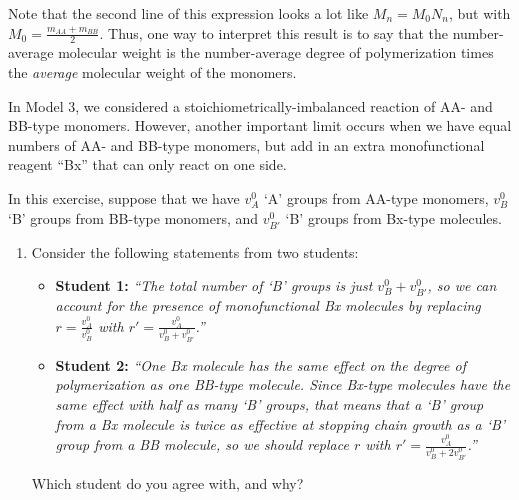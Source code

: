 \begin{activity}
\begin{exercises}
\begin{enumerate}
\begin{solution}
{						Note that the second line of this expression looks a lot like $M_n = M_0 N_n$, but with $M_0 = \frac{m_{AA} + m_{BB}}{2}$.  Thus, one way to interpret this result is to say that the number-average molecular weight is the number-average degree of polymerization times the \emph{average} molecular weight of the monomers.
					}\end{solution}
				
			\end{enumerate}
		
		\exercise In Model 3, we considered a stoichiometrically-imbalanced reaction of AA- and BB-type monomers.  However, another important limit occurs when we have equal numbers of AA- and BB-type monomers, but add in an extra monofunctional reagent ``Bx'' that can only react on one side.
		
			In this exercise, suppose that we have $v_A^0$ `A' groups from AA-type monomers, $v_B^0$ `B' groups from BB-type monomers, and $v_{B'}^0$ `B' groups from Bx-type molecules.
		
			\begin{enumerate}
				\item Consider the following statements from two students:
					
					\begin{itemize}
				
					\item \textbf{Student 1:} \emph{``The total number of `B' groups is just $v_B^0 + v_{B'}^0$, so we can account for the presence of monofunctional Bx molecules by replacing $r=\frac{v_A^0}{v_B^0}$ with $r'=\frac{v_A^0}{v_B^0 + v_{B'}^0}$.''}
					
					\item \textbf{Student 2:} \emph{``One Bx molecule has the same effect on the degree of polymerization as one BB-type molecule.  Since Bx-type molecules have the same effect with half as many `B' groups, that means that a `B' group from a Bx molecule is twice as effective at stopping chain growth as a `B' group from a BB molecule, so we should replace $r$ with $r'=\frac{v_A^0}{v_B^0 + 2v_{B'}^0}$.''}
					\end{itemize}
					
					Which student do you agree with, and why?
				
					\begin{solution}
\end{solution}
\end{enumerate}
\end{exercises}
\end{activity}
